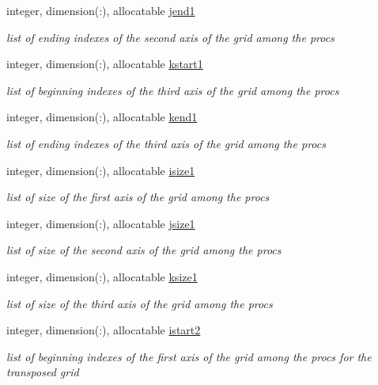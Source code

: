 \begin{DoxyCompactItemize}
integer, dimension(\-:), allocatable \hyperlink{classfft_a36b50ebfb01d553c2d6f1376d57639a8}{jend1}
\begin{DoxyCompactList}\small\item\em list of ending indexes of the second axis of the grid among the procs \end{DoxyCompactList}\item 
integer, dimension(\-:), allocatable \hyperlink{classfft_a1f4fe9a28b16da2c529fac36e0396d4c}{kstart1}
\begin{DoxyCompactList}\small\item\em list of beginning indexes of the third axis of the grid among the procs \end{DoxyCompactList}\item 
integer, dimension(\-:), allocatable \hyperlink{classfft_ae7e4ffb85ebf62ef0f2ef10f04e2f0de}{kend1}
\begin{DoxyCompactList}\small\item\em list of ending indexes of the third axis of the grid among the procs \end{DoxyCompactList}\item 
integer, dimension(\-:), allocatable \hyperlink{classfft_a8b6be0b5847c18ae92ab7e4cdc6797ae}{isize1}
\begin{DoxyCompactList}\small\item\em list of size of the first axis of the grid among the procs \end{DoxyCompactList}\item 
integer, dimension(\-:), allocatable \hyperlink{classfft_aff713d4158514d9c4471f31c97884d52}{jsize1}
\begin{DoxyCompactList}\small\item\em list of size of the second axis of the grid among the procs \end{DoxyCompactList}\item 
integer, dimension(\-:), allocatable \hyperlink{classfft_a737d6288ef056a8d5626686622b05a2e}{ksize1}
\begin{DoxyCompactList}\small\item\em list of size of the third axis of the grid among the procs \end{DoxyCompactList}\item 
integer, dimension(\-:), allocatable \hyperlink{classfft_ab0ad37b8471978ecdeff1a3aca768f39}{istart2}
\begin{DoxyCompactList}\small\item\em list of beginning indexes of the first axis of the grid among the procs for the transposed grid \end{DoxyCompactList}\item 

\end{DoxyCompactItemize}
